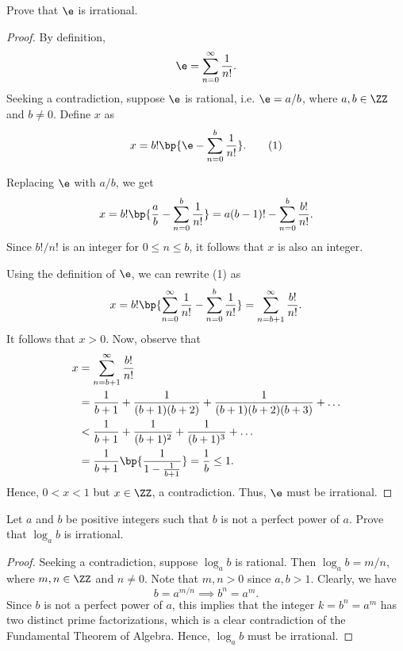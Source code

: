 \begin{problem}
    Prove that $\e$ is irrational.
\end{problem}
\begin{proof}
    By definition, \[\e = \sum_{n = 0}^\infty \frac1{n!}.\] Seeking a contradiction, suppose $\e$ is rational, i.e. $\e = a/b$, where $a, b \in \ZZ$ and $b \neq 0$. Define $x$ as \[x = b! \bp{\e - \sum_{n = 0}^b \frac1{n!}}. \tag{1}\]
    
    Replacing $\e$ with $a/b$, we get \[x = b! \bp{\frac{a}{b} - \sum_{n = 0}^b \frac1{n!}} = a(b-1)! - \sum_{n = 0}^b \frac{b!}{n!}.\] Since $b!/n!$ is an integer for $0 \leq n \leq b$, it follows that $x$ is also an integer.

    Using the definition of $\e$, we can rewrite (1) as \[x = b! \bp{\sum_{n = 0}^\infty \frac1{n!} - \sum_{n = 0}^b \frac1{n!}} = \sum_{n = b+1}^\infty \frac{b!}{n!}.\] It follows that $x > 0$. Now, observe that
    \begin{align*}
        x &= \sum_{n = b+1}^\infty \frac{b!}{n!}\\
        &= \frac1{b + 1} + \frac1{(b+1)(b+2)} + \frac1{(b+1)(b+2)(b+3)} + \dots\\
        &< \frac1{b+1} + \frac1{(b+1)^2} + \frac1{(b+1)^3} + \dots\\
        &= \frac1{b+1} \bp{\frac1{1 - \frac1{b+1}}} = \frac1b \leq 1.
    \end{align*}
    Hence, $0 < x < 1$ but $x \in \ZZ$, a contradiction. Thus, $\e$ must be irrational.
\end{proof}

\clearpage
\begin{problem}
    Let $a$ and $b$ be positive integers such that $b$ is not a perfect power of $a$. Prove that $\log_a b$ is irrational.
\end{problem}
\begin{proof}
    Seeking a contradiction, suppose $\log_a b$ is rational. Then $\log_a b = m/n$, where $m, n \in \ZZ$ and $n \neq 0$. Note that $m, n > 0$ since $a, b > 1$. Clearly, we have \[b = a^{m/n} \implies b^n = a^m.\] Since $b$ is not a perfect power of $a$, this implies that the integer $k = b^n = a^m$ has two distinct prime factorizations, which is a clear contradiction of the Fundamental Theorem of Algebra. Hence, $\log_a b$ must be irrational.
\end{proof}